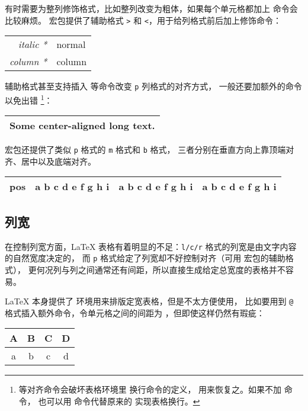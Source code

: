 有时需要为整列修饰格式，比如整列改变为粗体，如果每个单元格都加上  命令会比较麻烦。
 宏包提供了辅助格式 \texttt> 和 \texttt<，用于给列格式前后加上修饰命令：
\begin{example}
\begin{tabular}{>{\itshape}r<{*}l}
  \hline
  italic & normal \\
  column & column \\
  \hline
\end{tabular}
\end{example}

辅助格式甚至支持插入  等命令改变 \texttt{p} 列格式的对齐方式，
一般还要加额外的命令  以免出错%
\footnote{ 等对齐命令会破坏表格环境里 \crcmd{} 换行命令的定义，
 用来恢复之。如果不加  命令，
也可以用  命令代替原来的 \crcmd{} 实现表格换行。}：
\begin{example}
\begin{tabular}%
{>{\centering\arraybackslash}p{9em}}
  \hline
  Some center-aligned long text. \\
  \hline
\end{tabular}
\end{example}

 宏包还提供了类似 \texttt{p} 格式的 \texttt{m} 格式和 \texttt{b} 格式，
三者分别在垂直方向上靠顶端对齐、居中以及底端对齐。
\begin{example}
\newcommand\txt{a b c d e f g h i}
\begin{tabular}{cp{2em}m{2em}b{2em}}
  \hline
  pos & \txt & \txt & \txt \\
  \hline
\end{tabular}
\end{example}

\subsection{列宽}\label{subsec:colwidth}

在控制列宽方面，\LaTeX{} 表格有着明显的不足：\texttt{l/c/r} 格式的列宽是由文字内容的自然宽度决定的，
而 \texttt{p} 格式给定了列宽却不好控制对齐（可用  宏包的辅助格式），
更何况列与列之间通常还有间距，所以直接生成给定总宽度的表格并不容易。

\LaTeX{} 本身提供了  环境用来排版定宽表格，但是不太方便使用，
比如要用到 \texttt{@} 格式插入额外命令，令单元格之间的间距为 ，但即使这样仍然有瑕疵：
\begin{example}
\begin{tabular*}{14em}%
{@{\extracolsep{\fill}}|c|c|c|c|}
  \hline
  A & B & C & D \\ \hline
  a & b & c & d \\ \hline
\end{tabular*}
\end{example}

